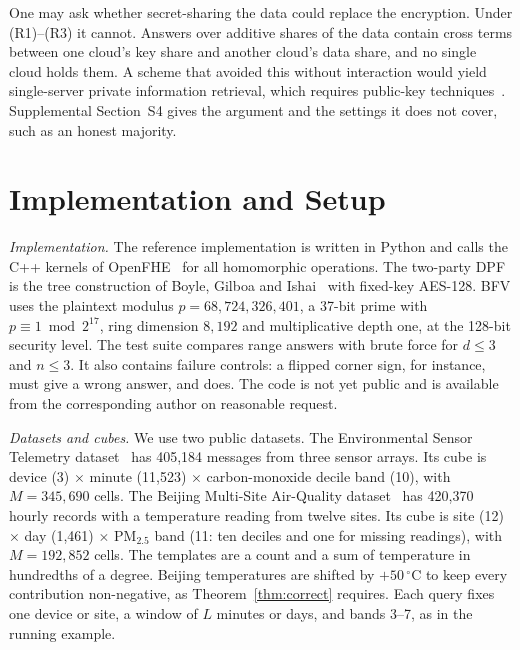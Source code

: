 \documentclass[10pt,journal,compsoc]{IEEEtran}
\begin{document}
One may ask whether secret-sharing the data could replace the encryption.
Under (R1)--(R3) it cannot. Answers over additive shares of the data contain
cross terms between one cloud's key share and another cloud's data share, and
no single cloud holds them. A scheme that avoided this without interaction
would yield single-server private information retrieval, which requires
public-key techniques~\cite{dicrescenzo2000single,kushilevitz1997replication}.
Supplemental Section~S4 gives the argument and the settings it does not cover,
such as an honest majority.

\section{Implementation and Setup}
\label{sec:setup}

\emph{Implementation.} The reference implementation is written in Python and
calls the C++ kernels of OpenFHE~\cite{openfhe} for all homomorphic
operations. The two-party DPF is the tree construction of Boyle, Gilboa and
Ishai~\cite{boyle2016function} with fixed-key AES-128. BFV uses the plaintext
modulus $p=68{,}724{,}326{,}401$, a 37-bit prime with $p\equiv1\bmod2^{17}$,
ring dimension $8{,}192$ and multiplicative depth one, at the 128-bit security
level. The test suite compares range answers with brute force for $d\le3$ and
$n\le3$. It also contains failure controls: a flipped corner sign, for
instance, must give a wrong answer, and does. The code is not yet public and
is available from the corresponding author on reasonable request.

\emph{Datasets and cubes.} We use two public datasets. The Environmental
Sensor Telemetry dataset~\cite{stafford_2020_environmental} has 405,184
messages from three sensor arrays. Its cube is device (3) $\times$ minute
(11,523) $\times$ carbon-monoxide decile band (10), with $M=345{,}690$ cells.
The Beijing Multi-Site Air-Quality dataset~\cite{chen2019beijing,zhang2017cautionary}
has 420,370 hourly records with a temperature reading from twelve sites. Its
cube is site (12) $\times$ day (1,461) $\times$ PM$_{2.5}$ band (11: ten deciles
and one for missing readings), with $M=192{,}852$ cells. The templates are a
count and a sum of temperature in hundredths of a degree. Beijing temperatures
are shifted by $+50\,^\circ$C to keep every contribution non-negative, as
Theorem~\ref{thm:correct} requires. Each query fixes one device or site, a
window of $L$ minutes or days, and bands 3--7, as in the running example.
\end{document}
